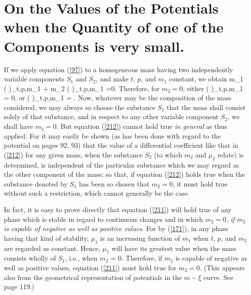 \documentclass[12pt]{article}
\begin{document}
\section{On the Values of the Potentials when the Quantity of one of the Components is very small.}
If we apply equation (\ref{97}) to a homogeneous mass having two independently variable components $S_1$ and $S_2$, and make $t$, $p$, and $m_1$ constant, we obtain
\eqs m_1 \left(  \right)_{t,p,m_1} + m_2 \left(  \right)_{t,p,m_1} =0. \label{210}\eqe
Therefore, for $m_2 = 0$, either
\eqs \left(  \right)_{t,p,m_1} = 0,  \label{211}\eqe
or    \eqs  \left(  \right)_{t,p,m_1} = \infty . \label{212}\eqe
Now, whatever may be the composition of the mass considered, we may always so choose the substance $S_1$ that the mass shall consist solely of that substance, and in respect to any other variable component $S_2$, we shall have $m_2=0$. But equation (\ref{212}) cannot hold true \textit{in general} as thus applied. For it may easily be shown (as has been done with regard to the potential on pages 92, 93) that the value of a differential coefficient like that in (\ref{212}) for any given mass, when the substance $S_2$ (to which $m_2$ and $\mu_2$ relate) is determined, is independent of the particular substance which we may regard as the other component of the mass; so that, if equation (\ref{212}) holds true when the substance denoted by $S_1$ has been so chosen that $m_2=0$, it must hold true without such a restriction, which cannot generally be the case.


In fact, it is easy to prove directly that equation (\ref{211}) will hold true of any phase which is stable in regard to continuous changes and in which $m_2 = 0$, \textit{if $m_2$ is capable of negative as well as positive values}. For by (\ref{171}), in any phase having that kind of stability, $\mu_1$ is an increasing function of $m_1$ when $t$, $p$, and $m_2$ are regarded as constant. Hence, $\mu_1$ will have its greatest value when the mass consists wholly of $S_1$, i.e., when $m_2$ = 0. Therefore, if $m_2$ is capable of negative as well as positive values, equation (\ref{211}) must hold true for $m_2=0$. (This appears also from the geometrical representation of potentials in the $m\!-\xi$ curve. See page 119.)
\end{document}
